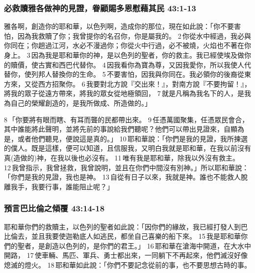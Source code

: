 \subsubsection{必救贖雅各做神的見證，眷顧賜多恩慰藉其民 43:1-13}
雅各啊，創造你的耶和華，以色列啊，造成你的那位，現在如此說：「你不要害怕，因為我救贖了你；我曾提你的名召你，你是屬我的。 2 你從水中經過，我必與你同在；你趟過江河，水必不漫過你；你從火中行過，必不被燒，火焰也不著在你身上。 3 因為我是耶和華你的神，是以色列的聖者，你的救主。我已經使埃及做你的贖價，使古實和西巴代替你。 4 因我看你為寶為尊，又因我愛你，所以我使人代替你，使列邦人替換你的生命。 5 不要害怕，因我與你同在。我必領你的後裔從東方來，又從西方招聚你。 6 我要對北方說『交出來！』，對南方說『不要拘留！』，將我的眾子從遠方帶來，將我的眾女從地極領回， 7 就是凡稱為我名下的人，是我為自己的榮耀創造的，是我所做成、所造做的。」

8 「你要將有眼而瞎、有耳而聾的民都帶出來。 9 任憑萬國聚集，任憑眾民會合，其中誰能將此聲明，並將先前的事說給我們聽呢？他們可以帶出見證來，自顯為是，或者他們聽見，便說這是真的。」 10 耶和華說：「你們是我的見證，我所揀選的僕人。既是這樣，便可以知道，且信服我，又明白我就是耶和華，在我以前沒有真(造做的)神，在我以後也必沒有。 11 唯有我是耶和華，除我以外沒有救主。 12 我曾指示，我曾拯救，我曾說明，並且在你們中間沒有別神。」所以耶和華說：「你們是我的見證，我也是神。 13 自從有日子以來，我就是神。誰也不能救人脫離我手，我要行事，誰能阻止呢？」

\subsubsection{預言巴比倫之傾覆 43:14-18}
耶和華你們的救贖主，以色列的聖者如此說：「因你們的緣故，我已經打發人到巴比倫去，並且我要使迦勒底人如逃民，都坐自己喜樂的船下來。 15 我是耶和華你們的聖者，是創造以色列的，是你們的君王。」 16 耶和華在滄海中開道，在大水中開路， 17 使車輛、馬匹、軍兵、勇士都出來，一同躺下不再起來，他們滅沒好像熄滅的燈火。 18 耶和華如此說：「你們不要記念從前的事，也不要思想古時的事。

